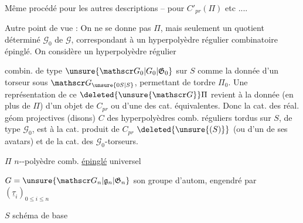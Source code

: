 Même procédé pour les autres descriptions -- pour $C'_{pr}(\Pi)$ etc ....

Autre point de vue : On ne se donne pas $\Pi$, mais seulement un  quotient déterminé $\mathscr G_0$ de $\mathscr G$,  correspondant à un hyperpolyèdre régulier combinatoire épinglé. On considère un hyperpolyèdre régulier


combin. de type $\unsure{\mathscr G_0|G_0|\mathfrak G_0}$ sur $S$ comme la donnée d'un torseur  sous $\mathscr G_{\unsure{0S|S}}$, permettant de tordre $\Pi_0$. Une représentation de ce $\deleted{\unsure{\mathscr G}}\Pi$ revient à la donnée (en plus de $\Pi$) d'un objet de $C_{pr}$ ou d'une des cat. équivalentes. Donc la cat. des réal. géom projectives (disons)  $C$ des hyperpolyèdres comb. réguliers tordus sur $S$, de type $\mathscr G_0$, est  à la cat. produit de $C_{pr}$ $\deleted{\unsure{(S)}}$ (ou d'un de ses avatars) et de la cat. des $\mathscr G_0$-torseurs.



$\Pi$ $n$--polyèdre comb. \uline{épinglé} universel

$G=\unsure{\mathscr G_n|\mathfrak g_n|\mathfrak G_n}$ son groupe d'autom, engendré par $(\underline\tau_i)_{0\leq i\leq n}$

$S$ schéma de base

